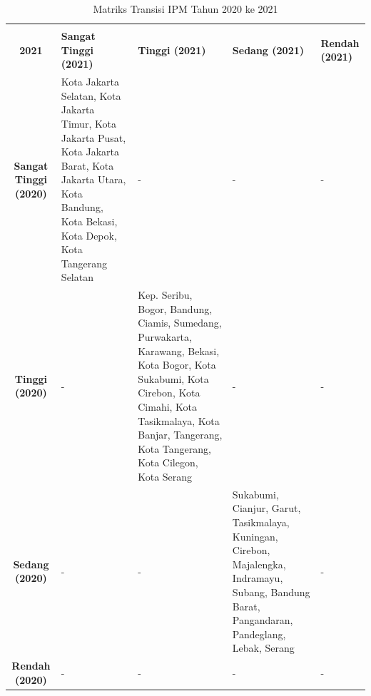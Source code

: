 \begin{table}[H]
\centering
\caption{Matriks Transisi IPM Tahun 2020 ke 2021} \label{tab:ipm_transisi_2020_2021}
\begin{tabular}{|c|p{2cm}|p{2cm}|p{2cm}|p{2cm}|}
\hline
\makecell{\textbf{Tahun 2020} \\ \textbf{2021}} & \textbf{Sangat Tinggi (2021)} & \textbf{Tinggi (2021)} & \textbf{Sedang (2021)} & \textbf{Rendah (2021)} \\ \hline
\textbf{Sangat Tinggi (2020)} & Kota Jakarta Selatan, Kota Jakarta Timur, Kota Jakarta Pusat, Kota Jakarta Barat, Kota Jakarta Utara, Kota Bandung, Kota Bekasi, Kota Depok, Kota Tangerang Selatan & - & - & - \\ \hline
\textbf{Tinggi (2020)} & - & Kep. Seribu, Bogor, Bandung, Ciamis, Sumedang, Purwakarta, Karawang, Bekasi, Kota Bogor, Kota Sukabumi, Kota Cirebon, Kota Cimahi, Kota Tasikmalaya, Kota Banjar, Tangerang, Kota Tangerang, Kota Cilegon, Kota Serang & - & - \\ \hline
\textbf{Sedang (2020)} & - & - & Sukabumi, Cianjur, Garut, Tasikmalaya, Kuningan, Cirebon, Majalengka, Indramayu, Subang, Bandung Barat, Pangandaran, Pandeglang, Lebak, Serang & - \\ \hline
\textbf{Rendah (2020)} & - & - & - & - \\ \hline
\end{tabular}
\end{table}